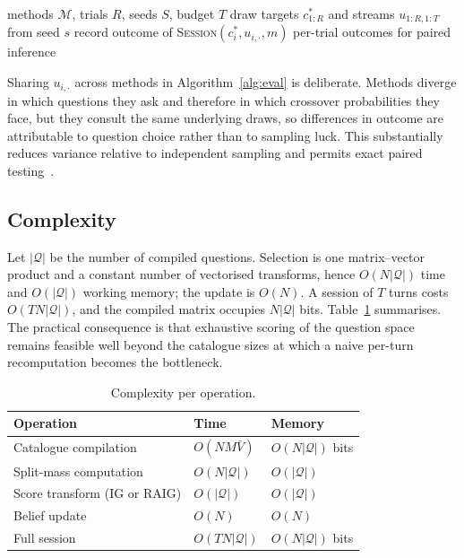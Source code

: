\documentclass[conference]{IEEEtran}
\newcommand{\Qset}{\mathcal{Q}}
\begin{document}
\begin{algorithm}[t]
\caption{Paired evaluation with common random numbers}
\label{alg:eval}
\begin{algorithmic}[1]
\Require methods $\mathcal{M}$, trials $R$, seeds $S$, budget $T$
  \State draw targets $c^\ast_{1:R}$ and streams $u_{1:R,1:T}$ from seed $s$
      \State record outcome of \textsc{Session}$(c^\ast_i, u_{i,\cdot}, m)$
    \EndFor
  \EndFor
\EndFor
\State \Return per-trial outcomes for paired inference
\end{algorithmic}
\end{algorithm}

Sharing $u_{i,\cdot}$ across methods in Algorithm~\ref{alg:eval} is deliberate.
Methods diverge in which questions they ask and therefore in which crossover
probabilities they face, but they consult the same underlying draws, so
differences in outcome are attributable to question choice rather than to
sampling luck. This substantially reduces variance relative to independent
sampling and permits exact paired testing~\cite{mcnemar1947}.

\subsection{Complexity}

Let $|\Qset|$ be the number of compiled questions. Selection is one
matrix--vector product and a constant number of vectorised transforms, hence
$O(N|\Qset|)$ time and $O(|\Qset|)$ working memory; the update is $O(N)$. A
session of $T$ turns costs $O(TN|\Qset|)$, and the compiled matrix occupies
$N|\Qset|$ bits. Table~\ref{tab:complexity} summarises. The practical
consequence is that exhaustive scoring of the question space remains feasible
well beyond the catalogue sizes at which a naive per-turn recomputation becomes
the bottleneck.

\begin{table}[t]
\caption{Complexity per operation.}
\label{tab:complexity}
\centering
\footnotesize
\begin{tabular}{@{}lll@{}}
\toprule
\textbf{Operation} & \textbf{Time} & \textbf{Memory} \\
\midrule
Catalogue compilation & $O(NM\bar{V})$ & $O(N|\Qset|)$ bits \\
Split-mass computation & $O(N|\Qset|)$ & $O(|\Qset|)$ \\
Score transform (IG or RAIG) & $O(|\Qset|)$ & $O(|\Qset|)$ \\
Belief update & $O(N)$ & $O(N)$ \\
Full session & $O(TN|\Qset|)$ & $O(N|\Qset|)$ bits \\
\bottomrule
\end{tabular}
\end{table}
\end{document}
